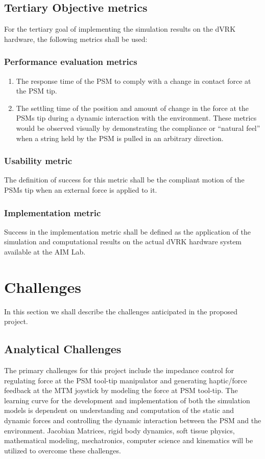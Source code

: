 \documentclass[10pt,journal,compsoc]{IEEEtran}
\begin{document}
\subsection{Tertiary Objective metrics}
For the tertiary goal of implementing the simulation results on the dVRK hardware, the following metrics shall be used:

\subsubsection{Performance evaluation metrics}
			\begin{enumerate}
				\item The response time of the PSM to comply with a change in contact force at the PSM tip.
				\item The settling time of the position and amount of change in the force at the PSM\textquotesingle s tip during a dynamic interaction with the environment. 
These metrics would be observed visually by demonstrating the compliance or \enquote{natural feel} when a string held by the PSM is pulled in an arbitrary direction.
			\end{enumerate}
			
\subsubsection{Usability metric}
The definition of success for this metric shall be the compliant motion of the PSM\textquotesingle s tip when an external force is applied to it.
			
\subsubsection{Implementation metric}
Success in the implementation metric shall be defined as the application of the simulation and computational results on the actual dVRK hardware system available at the AIM Lab.
			
\section{Challenges}
In this section we shall describe the challenges anticipated in the proposed project.

\subsection{Analytical Challenges}
The primary challenges for this project include the impedance control for regulating force at the PSM tool-tip manipulator and generating haptic/force feedback at the MTM joystick by modeling the force at PSM tool-tip. The learning curve for the development and implementation of both the simulation models is dependent on understanding and computation of the static and dynamic forces and controlling the dynamic interaction between the PSM and the environment. Jacobian Matrices, rigid body dynamics, soft tissue physics, mathematical modeling, mechatronics, computer science and kinematics will be utilized to overcome these challenges.
\end{document}
